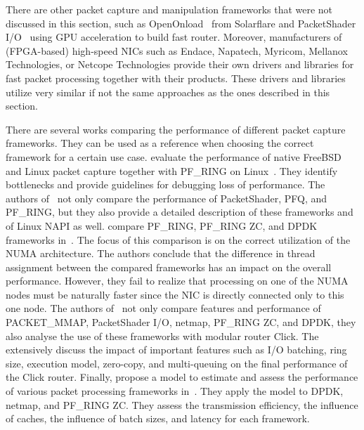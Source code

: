 There are other packet capture and manipulation frameworks that were not discussed in this section, such as OpenOnload~\cite{Mansley-2008-Getting} from Solarflare and PacketShader I/O~\cite{Han-2010-PacketShader} using GPU acceleration to build fast router. Moreover, manufacturers of (FPGA-based) high-speed NICs such as Endace, Napatech, Myricom, Mellanox Technologies, or Netcope Technologies provide their own drivers and libraries for fast packet processing together with their products. These drivers and libraries utilize very similar if not the same approaches as the ones described in this section.

There are several works comparing the performance of different packet capture frameworks. They can be used as a reference when choosing the correct framework for a certain use case. \citeauthor{Braun-2010-Comparing} evaluate the performance of native FreeBSD and Linux packet capture together with PF\_RING on Linux~\cite{Braun-2010-Comparing}. They identify bottlenecks and provide guidelines for debugging loss of performance. The authors of~\cite{Garcia-Dorado-2013-High} not only compare the performance of PacketShader, PFQ, and PF\_RING, but they also provide a detailed description of these frameworks and of Linux NAPI as well. \citeauthor{Wang-2016-Comparison} compare PF\_RING, PF\_RING ZC, and DPDK frameworks in~\cite{Wang-2016-Comparison}. The focus of this comparison is on the correct utilization of the NUMA architecture. The authors conclude that the difference in thread assignment between the compared frameworks has an impact on the overall performance. However, they fail to realize that processing on one of the NUMA nodes must be naturally faster since the NIC is directly connected only to this one node. The authors of~\cite{Barbette-2015-Fast} not only compare features and performance of PACKET\_MMAP, PacketShader I/O, netmap, PF\_RING ZC, and DPDK, they also analyse the use of these frameworks with modular router Click. The extensively discuss the impact of important features such as I/O batching, ring size, execution model, zero-copy, and multi-queuing on the final performance of the Click router. Finally, \citeauthor{Gallenmueller-2015-Comparison} propose a model to estimate and assess the performance of various packet processing frameworks in~\cite{Gallenmueller-2015-Comparison}. They apply the model to DPDK, netmap, and PF\_RING ZC. They assess the transmission efficiency, the influence of caches, the influence of batch sizes, and latency for each framework.



